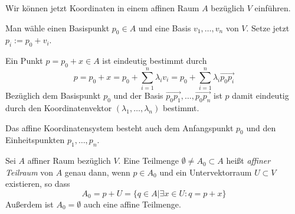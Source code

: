 \documentclass{mycourse}
\begin{document}
Wir können jetzt Koordinaten in einem affinen Raum $A$ bezüglich $V$ einführen.

Man wähle einen Basispunkt $p_0\in A$ und eine Basis $v_1,\dotsc,v_n$ von $V$.
Setze jetzt $p_i := p_0 + v_i$.

Ein Punkt $p = p_0 +x\in A$ ist eindeutig bestimmt durch
\[
	p = p_0 + x = p_0 + \sum_{i=1}^n\lambda_i v_i = p_0 + \sum_{i=1}^n\lambda_i \vec{p_0p_i}
\]
Bezüglich dem Basispunkt $p_0$ und der Basis $\vec{p_0p_1},\dotsc,\vec{p_0p_n}$ ist $p$ damit eindeutig durch den Koordinatenvektor $(\lambda_1,\dotsc,\lambda_n)$ bestimmt.

Das affine Koordinatensystem besteht auch dem Anfangspunkt $p_0$ und den Einheitspunkten $p_1,\dotsc,p_n$.

\begin{df}
	\label{df: 8.5}
Sei $A$ affiner Raum bezüglich $V$. 
Eine Teilmenge $\emptyset \neq A_0 \subset A$ heißt \emph{affiner Teilraum} von $A$ genau dann, wenn $p \in A_0$ und ein Untervektorraum $U\subset V$ existieren, so dass 
\[
	A_0=p + U = \{q\in A\big| \exists x\in U: q=p+x\}
\]
Außerdem ist $A_0 = \emptyset$ auch eine affine Teilmenge.
\end{df}
\end{document}
